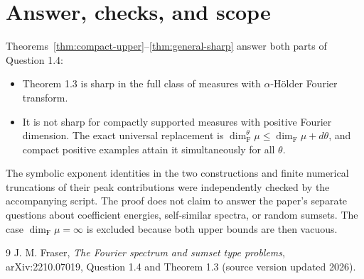 \documentclass[11pt]{article}
\newcommand{\Fdim}{\dim_{\mathrm F}}
\begin{document}
\section{Answer, checks, and scope}

Theorems~\ref{thm:compact-upper}--\ref{thm:general-sharp} answer both parts
of Question 1.4:
\begin{itemize}
 \item Theorem 1.3 is sharp in the full class of measures with
 $\alpha$-H\"older Fourier transform.
 \item It is not sharp for compactly supported measures with positive
 Fourier dimension. The exact universal replacement is
 \(\dim_{\mathrm F}^{\theta}\mu\le\Fdim\mu+d\theta\), and compact positive
 examples attain it simultaneously for all $\theta$.
\end{itemize}

The symbolic exponent identities in the two constructions and finite
numerical truncations of their peak contributions were independently checked
by the accompanying script. The proof does not claim to answer the paper's
separate questions about coefficient energies, self-similar spectra, or
random sumsets. The case $\Fdim\mu=\infty$ is excluded because both upper
bounds are then vacuous.

\begin{thebibliography}{9}
J. M. Fraser,
\emph{The Fourier spectrum and sumset type problems},
arXiv:2210.07019, Question 1.4 and Theorem 1.3 (source version updated 2026).
\end{thebibliography}
\end{document}
